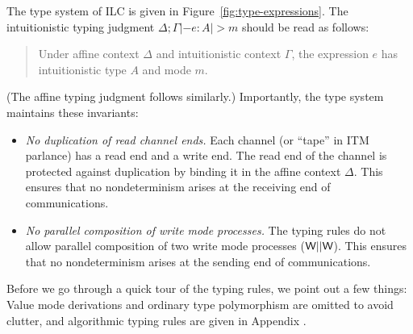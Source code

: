 %

The type system of ILC is given in Figure~\ref{fig:type-expressions}. The
intuitionistic typing judgment $\Delta ; \Gamma |- e : A |> m$ should be read as follows:
\begingroup
\addtolength\leftmargini{-.2in}
\begin{quote}
  Under affine context $\Delta$ and intuitionistic context $\Gamma$, the expression $e$
  has intuitionistic type $A$ and mode $m$.
\end{quote}
\endgroup
\noindent (The affine typing judgment follows similarly.) Importantly, the type
  system maintains these invariants:

\begin{comment}
Judgments have the form $\Delta ; \Gamma |- e : A |> m$, where $\Delta$ is an affine typing
context, $\Gamma$ is an intuitionistic typing context, and $m \in \{\Wm, \Rm, \Vm\}$ is
a mode (write, read, and value, respectively). Importantly, it maintains these
invariants:
\end{comment}

\begin{itemize}[leftmargin=*]
\item \emph{No duplication of read channel ends.} Each channel (or ``tape'' in
  ITM parlance) has a read end and a write end. The read end of the channel is
  protected against duplication by binding it in the affine context $\Delta$. This
  ensures that no nondeterminism arises at the receiving end of communications.

\item \emph{No parallel composition of write mode processes.} The typing rules
  do not allow parallel composition of two write mode processes ($\textsf{W} ||
  \textsf{W}$). This ensures that no nondeterminism arises at the sending end of
  communications.
\end{itemize}

\begin{comment}
To summarize, it maintains these invariants to ensure that \emph{well-typed ILC
programs are expressible as ITMs}:
\begin{itemize}[leftmargin=*]
  \item No duplication of read channel ends.
  \item No parallel composition of write mode processes.
\end{itemize}
\end{comment}

Before we go through a quick tour of the typing rules, we point out a few
things: Value mode derivations and ordinary type polymorphism are omitted to
avoid clutter, and algorithmic typing rules are given in Appendix \todo{}.

